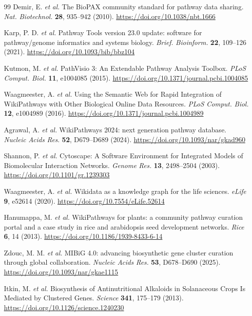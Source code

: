 \documentclass[11pt,a4paper]{article}
\begin{document}
\begin{thebibliography}{99}
Demir, E. \textit{et al.} The BioPAX community standard for pathway data sharing. \textit{Nat. Biotechnol.} \textbf{28}, 935--942 (2010). \url{https://doi.org/10.1038/nbt.1666}

Karp, P. D. \textit{et al.} Pathway Tools version 23.0 update: software for pathway/genome informatics and systems biology. \textit{Brief. Bioinform.} \textbf{22}, 109--126 (2021). \url{https://doi.org/10.1093/bib/bbz104}

Kutmon, M. \textit{et al.} PathVisio 3: An Extendable Pathway Analysis Toolbox. \textit{PLoS Comput. Biol.} \textbf{11}, e1004085 (2015). \url{https://doi.org/10.1371/journal.pcbi.1004085}

Waagmeester, A. \textit{et al.} Using the Semantic Web for Rapid Integration of WikiPathways with Other Biological Online Data Resources. \textit{PLoS Comput. Biol.} \textbf{12}, e1004989 (2016). \url{https://doi.org/10.1371/journal.pcbi.1004989}

Agrawal, A. \textit{et al.} WikiPathways 2024: next generation pathway database. \textit{Nucleic Acids Res.} \textbf{52}, D679--D689 (2024). \url{https://doi.org/10.1093/nar/gkad960}

Shannon, P. \textit{et al.} Cytoscape: A Software Environment for Integrated Models of Biomolecular Interaction Networks. \textit{Genome Res.} \textbf{13}, 2498--2504 (2003). \url{https://doi.org/10.1101/gr.1239303}

Waagmeester, A. \textit{et al.} Wikidata as a knowledge graph for the life sciences. \textit{eLife} \textbf{9}, e52614 (2020). \url{https://doi.org/10.7554/eLife.52614}

Hanumappa, M. \textit{et al.} WikiPathways for plants: a community pathway curation portal and a case study in rice and arabidopsis seed development networks. \textit{Rice} \textbf{6}, 14 (2013). \url{https://doi.org/10.1186/1939-8433-6-14}

Zdouc, M. M. \textit{et al.} MIBiG 4.0: advancing biosynthetic gene cluster curation through global collaboration. \textit{Nucleic Acids Res.} \textbf{53}, D678--D690 (2025). \url{https://doi.org/10.1093/nar/gkae1115}

Itkin, M. \textit{et al.} Biosynthesis of Antinutritional Alkaloids in Solanaceous Crops Is Mediated by Clustered Genes. \textit{Science} \textbf{341}, 175--179 (2013). \url{https://doi.org/10.1126/science.1240230}


\end{thebibliography}
\end{document}

